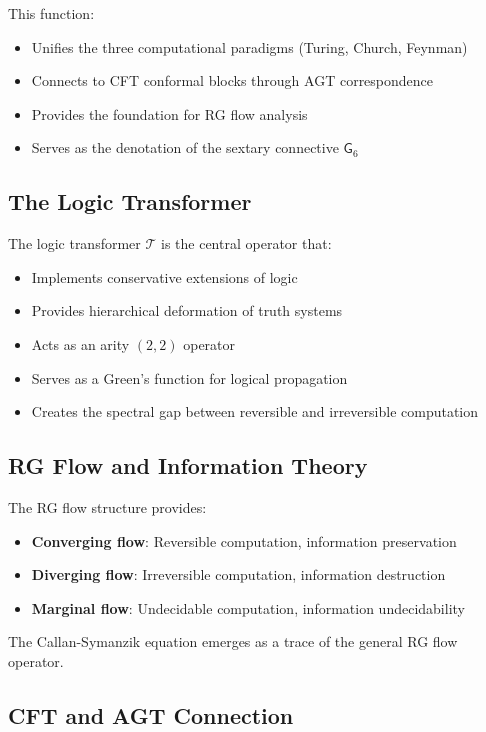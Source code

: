 This function:
\begin{itemize}
\item Unifies the three computational paradigms (Turing, Church, Feynman)
\item Connects to CFT conformal blocks through AGT correspondence
\item Provides the foundation for RG flow analysis
\item Serves as the denotation of the sextary connective $\mathsf{G}_6$
\end{itemize}

\subsection{The Logic Transformer}

The logic transformer $\mathcal{T}$ is the central operator that:
\begin{itemize}
\item Implements conservative extensions of logic
\item Provides hierarchical deformation of truth systems
\item Acts as an arity $(2,2)$ operator
\item Serves as a Green's function for logical propagation
\item Creates the spectral gap between reversible and irreversible computation
\end{itemize}

\subsection{RG Flow and Information Theory}

The RG flow structure provides:
\begin{itemize}
\item \textbf{Converging flow}: Reversible computation, information preservation
\item \textbf{Diverging flow}: Irreversible computation, information destruction
\item \textbf{Marginal flow}: Undecidable computation, information undecidability
\end{itemize}

The Callan-Symanzik equation emerges as a trace of the general RG flow operator.

\subsection{CFT and AGT Connection}

